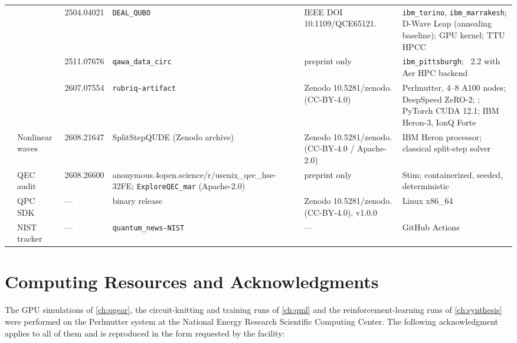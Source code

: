 \begin{longtable}{@{}L{1.1cm}L{2.15cm}L{1.7cm}L{3.0cm}L{2.75cm}L{3.1cm}@{}}
 & \deal{}~\cite{guo2025deal} & 2504.04021 & \texttt{DEAL\_QUBO} & IEEE DOI 10.1109/\allowbreak QCE65121. & \texttt{ibm\_torino}, \texttt{ibm\_marrakesh}; D-Wave Leap (annealing baseline); \qiskit{} GPU kernel; TTU HPCC \\
 & \qawa{}~\cite{guo2025qawa} & 2511.07676 & \texttt{qawa\_data\_circ} & preprint only & \texttt{ibm\_pittsburgh}; \qiskit{}~2.2 with Aer HPC backend \\
 & \rubriq{}~\cite{guo2026rubriq} & 2607.07554 & \texttt{rubriq-artifact} & Zenodo 10.5281/\allowbreak zenodo. (CC-BY-4.0)~\cite{guo2026rubriqsoftware} & Perlmutter, 4--8 A100 nodes; DeepSpeed ZeRO-2; \cudaq{}; PyTorch CUDA 12.1; IBM Heron-3, IonQ Forte \\
 & Nonlinear waves~\cite{guo2026nonlinearwaves} & 2608.21647 & SplitStepQUDE (Zenodo archive) & Zenodo 10.5281/\allowbreak zenodo. (CC-BY-4.0 / Apache-2.0)~\cite{guo2026splitstepqude} & IBM Heron processor; classical split-step solver \\
 & QEC audit~\cite{guo2026qecaudit} & 2608.26600 & anonymous.4open.\allowbreak science/\allowbreak r/usenix\_qec\_\allowbreak hse-32FE; \texttt{ExploreQEC\_mar} (Apache-2.0) & preprint only & Stim; containerized, seeded, deterministic \\
 & QPC SDK~\cite{guo2026lightriderqpc} & --- & binary release & Zenodo 10.5281/\allowbreak zenodo. (CC-BY-4.0), v1.0.0 & Linux x86\_64 \\
 & NIST tracker~\cite{guo2026nisttracker} & --- & \texttt{quantum\_\allowbreak news-NIST} & --- & GitHub Actions \\
\end{longtable}
\endgroup

\section{Computing Resources and Acknowledgments}\label{sec:apprepro:hpc}

The GPU simulations of \cref{ch:qgear}, the circuit-knitting and training runs of \cref{ch:qml} and the reinforcement-learning runs of \cref{ch:synthesis} were performed on the Perlmutter system at the National Energy Research Scientific Computing Center. The following acknowledgment applies to all of them and is reproduced in the form requested by the facility:

